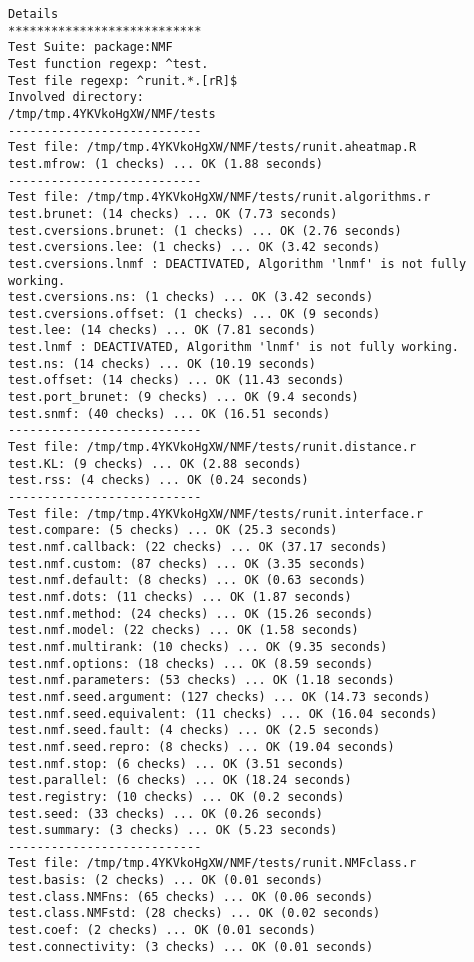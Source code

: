 \documentclass[10pt]{article}
\begin{document}
\begin{verbatim}
Details 
*************************** 
Test Suite: package:NMF 
Test function regexp: ^test. 
Test file regexp: ^runit.*.[rR]$ 
Involved directory: 
/tmp/tmp.4YKVkoHgXW/NMF/tests 
--------------------------- 
Test file: /tmp/tmp.4YKVkoHgXW/NMF/tests/runit.aheatmap.R 
test.mfrow: (1 checks) ... OK (1.88 seconds)
--------------------------- 
Test file: /tmp/tmp.4YKVkoHgXW/NMF/tests/runit.algorithms.r 
test.brunet: (14 checks) ... OK (7.73 seconds)
test.cversions.brunet: (1 checks) ... OK (2.76 seconds)
test.cversions.lee: (1 checks) ... OK (3.42 seconds)
test.cversions.lnmf : DEACTIVATED, Algorithm 'lnmf' is not fully working.
test.cversions.ns: (1 checks) ... OK (3.42 seconds)
test.cversions.offset: (1 checks) ... OK (9 seconds)
test.lee: (14 checks) ... OK (7.81 seconds)
test.lnmf : DEACTIVATED, Algorithm 'lnmf' is not fully working.
test.ns: (14 checks) ... OK (10.19 seconds)
test.offset: (14 checks) ... OK (11.43 seconds)
test.port_brunet: (9 checks) ... OK (9.4 seconds)
test.snmf: (40 checks) ... OK (16.51 seconds)
--------------------------- 
Test file: /tmp/tmp.4YKVkoHgXW/NMF/tests/runit.distance.r 
test.KL: (9 checks) ... OK (2.88 seconds)
test.rss: (4 checks) ... OK (0.24 seconds)
--------------------------- 
Test file: /tmp/tmp.4YKVkoHgXW/NMF/tests/runit.interface.r 
test.compare: (5 checks) ... OK (25.3 seconds)
test.nmf.callback: (22 checks) ... OK (37.17 seconds)
test.nmf.custom: (87 checks) ... OK (3.35 seconds)
test.nmf.default: (8 checks) ... OK (0.63 seconds)
test.nmf.dots: (11 checks) ... OK (1.87 seconds)
test.nmf.method: (24 checks) ... OK (15.26 seconds)
test.nmf.model: (22 checks) ... OK (1.58 seconds)
test.nmf.multirank: (10 checks) ... OK (9.35 seconds)
test.nmf.options: (18 checks) ... OK (8.59 seconds)
test.nmf.parameters: (53 checks) ... OK (1.18 seconds)
test.nmf.seed.argument: (127 checks) ... OK (14.73 seconds)
test.nmf.seed.equivalent: (11 checks) ... OK (16.04 seconds)
test.nmf.seed.fault: (4 checks) ... OK (2.5 seconds)
test.nmf.seed.repro: (8 checks) ... OK (19.04 seconds)
test.nmf.stop: (6 checks) ... OK (3.51 seconds)
test.parallel: (6 checks) ... OK (18.24 seconds)
test.registry: (10 checks) ... OK (0.2 seconds)
test.seed: (33 checks) ... OK (0.26 seconds)
test.summary: (3 checks) ... OK (5.23 seconds)
--------------------------- 
Test file: /tmp/tmp.4YKVkoHgXW/NMF/tests/runit.NMFclass.r 
test.basis: (2 checks) ... OK (0.01 seconds)
test.class.NMFns: (65 checks) ... OK (0.06 seconds)
test.class.NMFstd: (28 checks) ... OK (0.02 seconds)
test.coef: (2 checks) ... OK (0.01 seconds)
test.connectivity: (3 checks) ... OK (0.01 seconds)

\end{verbatim}
\end{document}
